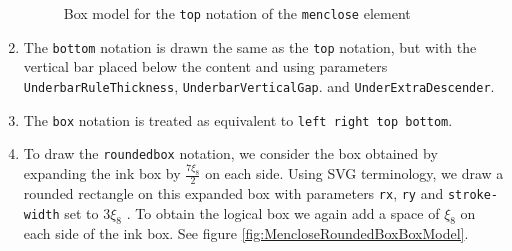 \begin{enumerate}
  \begin{figure}
\centering
{}
  \caption{Box model for the {\tt top}
    notation of the {\tt menclose} element}
\label{fig:MencloseTopBoxModel}
\end{figure}

\item The {\tt bottom} notation is drawn the same as the {\tt top} notation,
  but with the vertical bar placed below the content and using parameters
  {\tt UnderbarRuleThickness},
  {\tt UnderbarVerticalGap}.
  and {\tt UnderExtraDescender}.

\item The {\tt box} notation is treated as equivalent to
  {\tt left right top bottom}.

\item To draw the {\tt roundedbox} notation, we consider the box
  obtained by expanding the ink box by $\frac{7\xi_8}{2}$ on each side.
  Using SVG terminology, we draw a rounded rectangle on this expanded box
  with parameters {\tt rx}, {\tt ry} and {\tt stroke-width} set to $3\xi_8$
  \cite{SVG11}. To obtain the logical box we again add a space of $\xi_8$ on
  each side of the ink box. See figure \ref{fig:MencloseRoundedBoxBoxModel}.

  \begin{figure}
\centering
\end{figure}
\end{enumerate}
